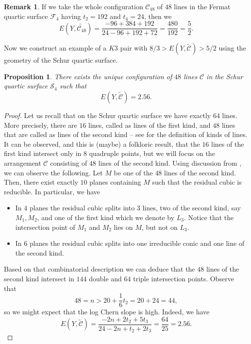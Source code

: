 \documentclass{article}
\theoremstyle{plain}
\newtheorem{proposition}[thm]{Proposition}
\theoremstyle{definition}
\newtheorem{remark}[thm]{Remark}
\numberwithin{equation}{section}
\begin{document}
\begin{remark}
If we take the whole configuration $\mathcal{C}_{48}$ of $48$ lines in the Fermat quartic surface $\mathcal{F}_{4}$ having $t_{2}=192$ and $t_{4}=24$, then we 
\[E(Y, \widetilde{\mathcal{C}_{48}}) = \frac{-96 + 384 + 192}{24 - 96 + 192 + 72}= \frac{480}{192}=\frac{5}{2}.\]
\end{remark}
\noindent
Now we construct an example of a $K3$ pair with $8/3 > E(Y, \widetilde{\mathcal{C}}) > 5/2$ using the geometry of the Schur quartic surface.
\begin{proposition}
There exists the unique configuration of $48$ lines $\mathcal{C}$ in the Schur quartic surface $\mathcal{S}_{4}$ such that
\[E(Y , \widetilde{\mathcal{C}}) = 2.56.\]
\end{proposition}
\begin{proof}
Let us recall that on the Schur quartic surface we have exactly $64$ lines. More precisely, there are $16$ lines, called as lines of the first kind, and $48$ lines that are called as lines of the second kind -- see \cite[Definition 3.3.10]{Davide} for the definition of kinds of lines. It can be observed, and this is (maybe) a folkloric result, that the $16$ lines of the first kind intersect only in $8$ quadruple points, but we will focus on the arrangement $\mathcal{C}$ consisting of $48$ lines of the second kind. Using discussion from \cite[Section 4.2]{Davide}, we can observe the following. Let $M$ be one of the $48$ lines of the second kind. Then, there exist exactly $10$ planes containing $M$ such that the residual cubic is reducible. In particular, we have
\begin{itemize}
\item In $4$ planes the residual cubic splits into $3$ lines, two of the second kind, say $M_{1}, M_{2}$, and one of the first kind which we denote by $L_{3}$. Notice that the intersection point of $M_{1}$ and $M_{2}$ lies on $M$, but not on $L_{3}$. 
\item In $6$ planes the residual cubic splits into one irreducible conic and one line of the second kind.
\end{itemize}
Based on that combinatorial description we can deduce that the $48$ lines of the second kind intersect in $144$ double and $64$ triple intersection points. Observe that 
\[48 = n > 20 + \frac{1}{6}t_{2} = 20 + 24 = 44,\]
so we might expect that the log Chern slope is high. Indeed, we have
\[E(Y , \widetilde{\mathcal{C}}) = \frac{-2n + 2t_{2} + 5t_{3}}{24-2n + t_{2} + 2t_{3}} = \frac{64}{25} = 2.56.\]
\end{proof}
\end{document}
